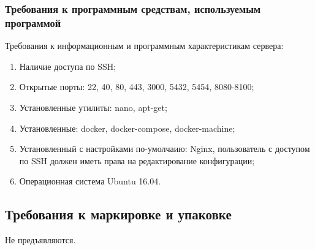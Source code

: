 \subsubsection{Требования к программным средствам, используемым программой}
Требования к информационным и программным характеристикам сервера:
\begin{enumerate}[noitemsep]
    \item Наличие доступа по SSH;
    \item Открытые порты: 22, 40, 80, 443, 3000, 5432, 5454, 8080-8100;
    \item Установленные утилиты: nano, apt-get;
    \item Установленные: docker, docker-compose, docker-machine;
    \item Установленный с настройками по-умолчаию: Nginx, пользователь с доступом по SSH должен иметь права
    на редактирование конфигурации;
    \item Операционная система Ubuntu 16.04.
\end{enumerate}

\subsection{Требования к маркировке и упаковке}

Не предъявляются.